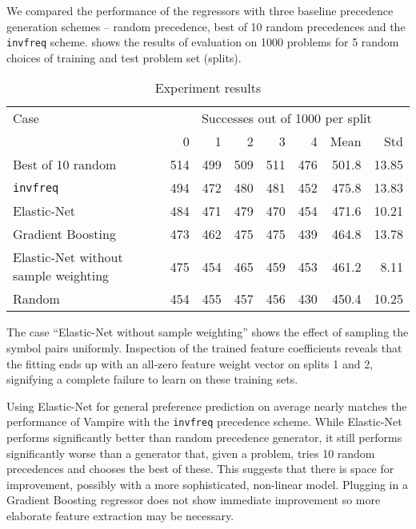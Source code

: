 \documentclass[a4paper]{easychair}
\begin{document}
We compared the performance of the regressors
with three baseline precedence generation schemes -- random precedence, best of 10 random precedences
and the \texttt{invfreq} scheme.
 shows the results of evaluation on 1000 problems
for 5 random choices of training and test problem set (splits).


\begin{table}[ht]
	\centering
	\begin{tabular}{l|rrrrr|rr}
		Case & \multicolumn{7}{c}{Successes out of 1000 per split} \\
		& 0 & 1 & 2 & 3 & 4 & Mean & Std \\
		\hline
		Best of 10 random & 514 & 499 & 509 & 511 & 476 & 501.8 & 13.85 \\
		\texttt{invfreq} & 494 & 472 & 480 & 481 & 452 & 475.8 & 13.83 \\
		Elastic-Net & 484 & 471 & 479 & 470 & 454 & 471.6 & 10.21 \\
		Gradient Boosting & 473 & 462 & 475 & 475 & 439 & 464.8 & 13.78 \\
		Elastic-Net without sample weighting & 475 & 454 & 465 & 459 & 453 & 461.2 & 8.11 \\
		Random & 454 & 455 & 457 & 456 & 430 & 450.4 & 10.25 \\
	\end{tabular}
	\caption{Experiment results}
	\label{table:results}
\end{table}

The case ``Elastic-Net without sample weighting'' shows the effect of
sampling the symbol pairs uniformly.
Inspection of the trained feature coefficients reveals that the fitting ends up
with an all-zero feature weight vector on splits 1 and 2,
signifying a complete failure to learn on these training sets.

Using Elastic-Net for general preference prediction on average nearly matches the performance
of Vampire with the \texttt{invfreq} precedence scheme.
While Elastic-Net performs significantly better than random precedence generator,
it still performs significantly worse than a generator
that, given a problem, tries 10 random precedences and chooses the best of these.
This suggests that there is space for improvement, possibly with a more sophisticated, non-linear model.
Plugging in a Gradient Boosting regressor does not show immediate improvement
so more elaborate feature extraction may be necessary.
\end{document}
